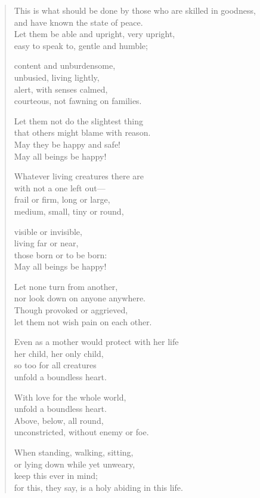 \documentclass[12pt,openany]{book}%
\begin{document}
\begin{verse}%
This is what should be done by those who are skilled in goodness, \\
and have known the state of peace. \\
Let them be able and upright, very upright, \\
easy to speak to, gentle and humble; 

content and unburdensome, \\
unbusied, living lightly, \\
alert, with senses calmed, \\
courteous, not fawning on families. 

Let them not do the slightest thing \\
that others might blame with reason. \\
May they be happy and safe! \\
May all beings be happy! 

Whatever living creatures there are \\
with not a one left out—\\
frail or firm, long or large, \\
medium, small, tiny or round, 

visible or invisible, \\
living far or near, \\
those born or to be born: \\
May all beings be happy! 

Let none turn from another, \\
nor look down on anyone anywhere. \\
Though provoked or aggrieved, \\
let them not wish pain on each other. 

Even as a mother would protect with her life \\
her child, her only child, \\
so too for all creatures \\
unfold a boundless heart. 

With love for the whole world, \\
unfold a boundless heart. \\
Above, below, all round, \\
unconstricted, without enemy or foe. 

When standing, walking, sitting, \\
or lying down while yet unweary, \\
keep this ever in mind; \\
for this, they say, is a holy abiding in this life. 


\end{verse}
\end{document}
